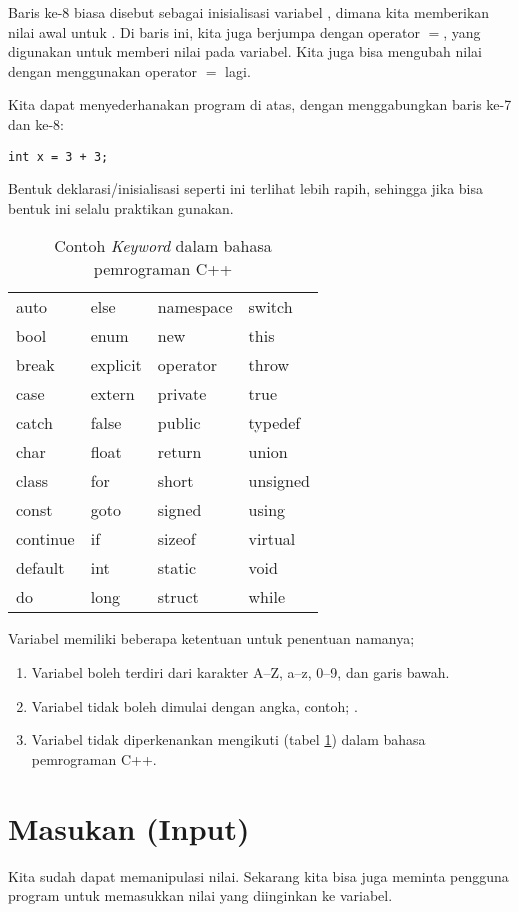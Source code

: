 \documentclass[../main.tex]{subfiles}
\begin{document}
Baris ke-8 biasa disebut sebagai inisialisasi variabel , dimana kita
memberikan nilai awal untuk . Di baris ini, kita juga berjumpa dengan
operator \(=\), yang digunakan untuk memberi nilai pada variabel. Kita juga bisa
mengubah nilai  dengan menggunakan operator \(=\) lagi.

Kita dapat menyederhanakan program di atas, dengan menggabungkan baris ke-7 dan
ke-8:
\begin{verbatim}
int x = 3 + 3;
\end{verbatim}

Bentuk deklarasi\slash{}inisialisasi seperti ini terlihat lebih rapih, sehingga
jika bisa bentuk ini selalu praktikan gunakan.

\begin{table}[htb]
\centering
\begin{tabular}{@{} l l l l @{}}
  \toprule
  auto & else & namespace & switch\\
  bool & enum & new & this\\
  break & explicit & operator & throw\\
  case & extern & private & true\\
  catch & false & public & typedef\\
  char & float & return & union\\
  class & for & short & unsigned\\
  const & goto & signed & using\\
  continue & if & sizeof & virtual\\
  default & int & static & void\\
  do & long & struct & while\\
  \bottomrule
\end{tabular}
\caption{Contoh \emph{Keyword} dalam bahasa pemrograman C++}
\label{ex-keyword}
\end{table}

Variabel memiliki beberapa ketentuan untuk penentuan namanya;
\begin{enumerate}
  \item Variabel boleh terdiri dari karakter A--Z, a--z, 0--9, dan garis bawah.
  \item Variabel tidak boleh dimulai dengan angka, contoh; .
  \item Variabel tidak diperkenankan mengikuti  (tabel
  \ref{ex-keyword}) dalam bahasa pemrograman C++.
\end{enumerate}

\section{Masukan (Input)}
Kita sudah dapat memanipulasi nilai. Sekarang kita bisa juga meminta pengguna
program untuk memasukkan nilai yang diinginkan ke variabel.
\end{document}
